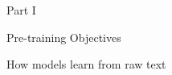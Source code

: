 \documentclass[aspectratio=169]{beamer}
\begin{document}
\begin{frame}
\begin{center}
\vspace{1.5cm}
{\Huge \textcolor{popblue}{Part I}}

\vspace{0.5cm}
{\Large Pre-training Objectives}

\vspace{0.5cm}
{\normalsize How models learn from raw text}
\end{center}
\end{frame}

\end{document}
